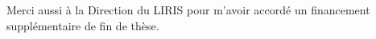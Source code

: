 Merci aussi à la Direction du LIRIS pour m'avoir accordé un financement supplémentaire de fin de thèse.




